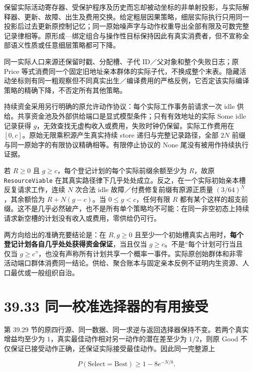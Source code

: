 \documentclass[
  11pt,
  oneside]{book}
\begin{document}
保留实际活动寄存器、受保护程序及历史而忘却被动坐标的非单射投影，与实际解释器、更新、故障、出生及费用交换。给定粗层因果策略，细层实际执行只用同一投影后过去更新原控制记忆；同一原始噪声字与动作权重导出全部有限及可数完整记录律相等。原形成---绑定组合与操作性目标保持因此有真实消费者，但不宣称全部语义性质或任意细层策略都可下降。

同一实际人口来源还保留时戳、分配槽、子代 ID／父对象和整个失败日志；原 Price 等式消费同一个固定旧地址亲本群体的实际子代，不换成整个末表。隐藏活动坐标则有同一粗观察但不同真实出生／编译费用的严格反例，它否定该实际编译策略的精确下降，不否定所有其他策略。

持续资金采用另行明确的原允许动作协议：每个实际工作事务前请求一次 idle 供给。共享资金池及外部供给端口是显式模型条件；只有有效地址的实际 Some idle 记录获得 \(g\)，无效查找无虚构收入或费用，失败时钟仍保留。实际工作费用在 \([0,c]\)。原始无限乘积源产生真实持续 store 递归与完整记录路径，全部 \(2N\) 前缀与同一原始字的有限协议精确相等。有限停止协议的 None 尾没有被用作持续执行证据。

若 \(R\ge0\) 且 \(g\ge c\)，每个登记计划的每个实际前缀余额至少为 \(R\)，故原 \nolinkurl{ResourceViable} 在其真实路径律下几乎处处成立。反之，在一个实际初始亲本槽反复请求工作，连续 \(N\) 次合法 idle 故障／付费修复前缀有原源正质量 \((3/64)^N\)，其余额恰为 \(R+N(g-c)\)。当 \(0\le g<c\)，任何有限 \(R\) 都有某个这样的超支前缀。这不是几乎必然破产，也不是所有单个策略均不可能：在同一非空初态上持续请求新空槽的计划没有收入或费用，零供给仍可行。

两方向给出的准确充要结论是：在 \(R,g\ge0\) 且至少一个初始槽真实占用时，\textbf{每个登记计划各自几乎处处获得资金保证}，当且仅当 \(g\ge c\)。不是``每个计划可行当且仅当 \(g\ge c\)''，也没有声称所有计划共享一个概率一事件。实际原创始群体和非零活动端口群体消费同一结论。供给、聚合账本与固定亲本反例不证明内生资源、人口最优或一般组织自治。

\section{39.33 同一校准选择器的有用接受}\label{ux540cux4e00ux6821ux51c6ux9009ux62e9ux5668ux7684ux6709ux7528ux63a5ux53d7}

第 39.29 节的原四行源、同一数据、同一求逆与返回选择器保持不变。若两个真实增益均至少为 \(1\)，真实最佳动作相对另一动作的潜在差至少为 \(1/2\)，则原 Good 不仅保证已接受动作正确，还保证实际接受最佳动作。因此同一完整源上

\[P(\mathrm{Select}=\mathrm{Best})\ge1-8e^{-N/8}.\]
\end{document}
